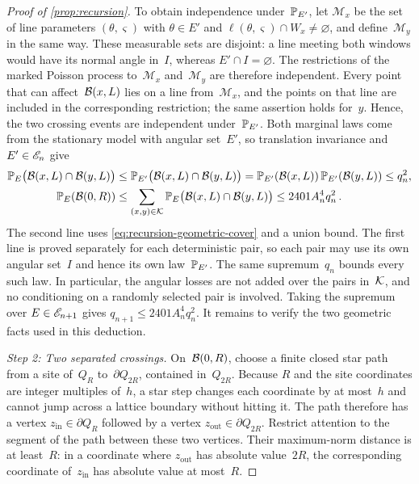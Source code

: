 \documentclass[11pt,letterpaper]{article}
\begin{document}
\begin{proof}[Proof of \cref{prop:recursion}]
To obtain independence under~$\P_{E'}$, let $\mathcal M_x$ be the set of line parameters $(\theta,\varsigma)$ with $\theta\in E'$ and $\ell(\theta,\varsigma)\cap W_x\neq\varnothing$, and define~$\mathcal M_y$ in the same way. These measurable sets are disjoint: a line meeting both windows would have its normal angle in~$I$, whereas $E'\cap I=\varnothing$. The restrictions of the marked Poisson process to~$\mathcal M_x$ and~$\mathcal M_y$ are therefore independent. Every point that can affect~$\cB(x,L)$ lies on a line from~$\mathcal M_x$, and the points on that line are included in the corresponding restriction; the same assertion holds for~$y$. Hence, the two crossing events are independent under~$\P_{E'}$. Both marginal laws come from the stationary model with angular set~$E'$, so translation invariance and $E'\in\cE_n$ give
\begin{align}\label{eq:recursion-probability-reduction}
  \P_E\bigl(\cB(x,L)\cap\cB(y,L)\bigr)&\le\P_{E'}\bigl(\cB(x,L)\cap\cB(y,L)\bigr)=\P_{E'}(\cB(x,L))\,\P_{E'}(\cB(y,L))\le q_n^2,\\
  \P_E(\cB(0,R))&\le\sum_{(x,y)\in\cK}\P_E\bigl(\cB(x,L)\cap\cB(y,L)\bigr)\le2401A_n^4q_n^2\,.\notag
\end{align}
The second line uses \eqref{eq:recursion-geometric-cover} and a union bound. The first line is proved separately for each deterministic pair, so each pair may use its own angular set~$I$ and hence its own law~$\P_{E'}$. The same supremum~$q_n$ bounds every such law. In particular, the angular losses are not added over the pairs in~$\cK$, and no conditioning on a randomly selected pair is involved. Taking the supremum over $E\in\cE_{n+1}$ gives $q_{n+1}\le2401A_n^4q_n^2$. It remains to verify the two geometric facts used in this deduction.

\emph{Step 2: Two separated crossings.} On~$\cB(0,R)$, choose a finite closed star path from a site of~$Q_R$ to~$\partial Q_{2R}$, contained in~$Q_{2R}$. Because $R$ and the site coordinates are integer multiples of~$h$, a star step changes each coordinate by at most~$h$ and cannot jump across a lattice boundary without hitting it. The path therefore has a vertex $z_{\mathrm{in}}\in\partial Q_R$ followed by a vertex $z_{\mathrm{out}}\in\partial Q_{2R}$. Restrict attention to the segment of the path between these two vertices. Their maximum-norm distance is at least~$R$: in a coordinate where $z_{\mathrm{out}}$ has absolute value~$2R$, the corresponding coordinate of~$z_{\mathrm{in}}$ has absolute value at most~$R$.


\end{proof}
\end{document}

